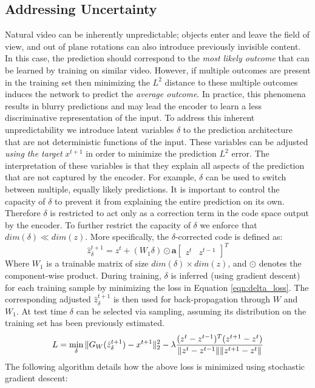 \documentclass{article} %
\begin{document}
\subsection{Addressing Uncertainty} 
\label{subsec:uncertainty} 
Natural video can be inherently unpredictable; objects enter and leave the field of view, and out of plane rotations can also introduce previously invisible content. In this case, the prediction should correspond to the \emph{most likely outcome} that can be learned by training on similar video. However, if multiple outcomes are present in the training set then minimizing the $L^2$ distance to these multiple outcomes induces the network to predict the \emph{average outcome}. In practice, this phenomena results in blurry predictions and may lead the encoder to learn a less discriminative representation of the input. To address this inherent unpredictability we introduce latent variables $\delta$ to the prediction architecture that are not deterministic functions of the input. These variables can be adjusted \emph{using the target} $x^{t+1}$ in order to minimize the prediction $L^2$ error. The interpretation of these variables is that they explain all aspects of the prediction that are not captured by the encoder. For example, $\delta$ can be used to switch between multiple, equally likely predictions. It is important to control the capacity of $\delta$ to prevent it from explaining the entire prediction on its own. Therefore $\delta$ is restricted to act only as a correction term in the code space output by the encoder. To further restrict the capacity of $\delta$ we enforce that $dim(\delta) \ll dim(z)$. 
More specifically, the $\delta$-corrected code is defined as:
\begin{equation} 
\label{eqn:delta}
\hat z^{t+1}_\delta =  z^{t} + (W_1 \delta) \odot \mathbf{a}\begin{bmatrix}z^t&z^{t-1}\end{bmatrix}^T
\end{equation}  
Where $W_1$ is a trainable matrix of size $dim(\delta) \times dim(z)$, and $\odot$ denotes the component-wise product.  
During training, $\delta$ is inferred (using gradient descent) for each training sample by minimizing the loss in Equation \ref{eqn:delta_loss}. The corresponding adjusted $\hat z_\delta ^{t+1}$ is then used for back-propagation through $W$ and $W_1$. At test time $\delta$ can be selected via sampling, assuming its distribution on the training set has been previously estimated.
\begin{equation} 
\label{eqn:delta_loss}
L = \min\limits_\delta \| G_W(\hat z_\delta ^{t+1}) - x^{t+1} \|^2_2 - \lambda \frac{(z^t - z^{t-1})^T(z^{t+1} - z^t)}{\|z^t-z^{t-1}\| \|z^{t+1} - z^t\|} \\
\end{equation} 
The following algorithm details how the above loss is minimized using stochastic gradient descent:
\end{document}
